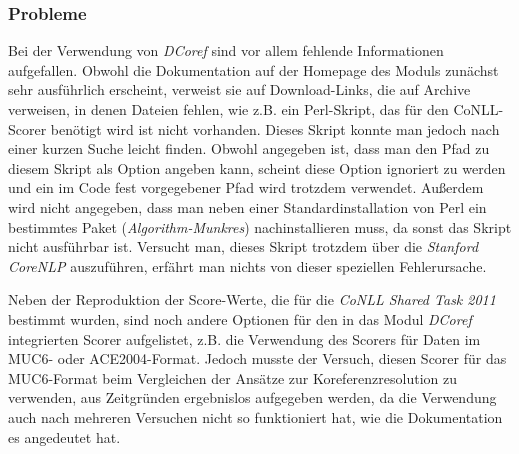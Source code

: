 \subsubsection{Probleme}

Bei der Verwendung von \emph{DCoref} sind vor allem fehlende Informationen aufgefallen. Obwohl die Dokumentation auf der Homepage des Moduls \autocite[]{chris_stanford_dcoref} zunächst sehr ausführlich erscheint, verweist sie auf Download-Links, die auf Archive verweisen, in denen Dateien fehlen, wie z.B. ein Perl-Skript, das für den CoNLL-Scorer benötigt wird ist nicht vorhanden. Dieses Skript konnte man jedoch nach einer kurzen Suche leicht finden. Obwohl angegeben ist, dass man den Pfad zu diesem Skript als Option angeben kann, scheint diese Option ignoriert zu werden und ein im Code fest vorgegebener Pfad wird trotzdem verwendet. Außerdem wird nicht angegeben, dass man neben einer Standardinstallation von Perl ein bestimmtes Paket (\emph{Algorithm-Munkres}) nachinstallieren muss, da sonst das Skript nicht ausführbar ist. Versucht man, dieses Skript trotzdem über die \emph{Stanford CoreNLP} auszuführen, erfährt man nichts von dieser speziellen Fehlerursache.

Neben der Reproduktion der Score-Werte, die für die \emph{CoNLL Shared Task 2011} bestimmt wurden, sind noch andere Optionen für den in das Modul \emph{DCoref} integrierten Scorer aufgelistet, z.B. die Verwendung des Scorers für Daten im MUC6- oder ACE2004-Format. Jedoch musste der Versuch, diesen Scorer für das MUC6-Format beim Vergleichen der Ansätze zur Koreferenzresolution zu verwenden, aus Zeitgründen ergebnislos aufgegeben werden, da die Verwendung auch nach mehreren Versuchen nicht so funktioniert hat, wie die Dokumentation es angedeutet hat. 
